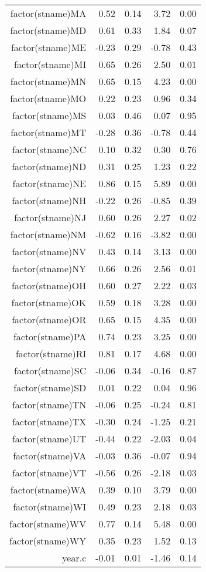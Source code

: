 \begin{table}[ht]
\begin{tabular}{rrrrr}
  factor(stname)MA & 0.52 & 0.14 & 3.72 & 0.00 \\ 
  factor(stname)MD & 0.61 & 0.33 & 1.84 & 0.07 \\ 
  factor(stname)ME & -0.23 & 0.29 & -0.78 & 0.43 \\ 
  factor(stname)MI & 0.65 & 0.26 & 2.50 & 0.01 \\ 
  factor(stname)MN & 0.65 & 0.15 & 4.23 & 0.00 \\ 
  factor(stname)MO & 0.22 & 0.23 & 0.96 & 0.34 \\ 
  factor(stname)MS & 0.03 & 0.46 & 0.07 & 0.95 \\ 
  factor(stname)MT & -0.28 & 0.36 & -0.78 & 0.44 \\ 
  factor(stname)NC & 0.10 & 0.32 & 0.30 & 0.76 \\ 
  factor(stname)ND & 0.31 & 0.25 & 1.23 & 0.22 \\ 
  factor(stname)NE & 0.86 & 0.15 & 5.89 & 0.00 \\ 
  factor(stname)NH & -0.22 & 0.26 & -0.85 & 0.39 \\ 
  factor(stname)NJ & 0.60 & 0.26 & 2.27 & 0.02 \\ 
  factor(stname)NM & -0.62 & 0.16 & -3.82 & 0.00 \\ 
  factor(stname)NV & 0.43 & 0.14 & 3.13 & 0.00 \\ 
  factor(stname)NY & 0.66 & 0.26 & 2.56 & 0.01 \\ 
  factor(stname)OH & 0.60 & 0.27 & 2.22 & 0.03 \\ 
  factor(stname)OK & 0.59 & 0.18 & 3.28 & 0.00 \\ 
  factor(stname)OR & 0.65 & 0.15 & 4.35 & 0.00 \\ 
  factor(stname)PA & 0.74 & 0.23 & 3.25 & 0.00 \\ 
  factor(stname)RI & 0.81 & 0.17 & 4.68 & 0.00 \\ 
  factor(stname)SC & -0.06 & 0.34 & -0.16 & 0.87 \\ 
  factor(stname)SD & 0.01 & 0.22 & 0.04 & 0.96 \\ 
  factor(stname)TN & -0.06 & 0.25 & -0.24 & 0.81 \\ 
  factor(stname)TX & -0.30 & 0.24 & -1.25 & 0.21 \\ 
  factor(stname)UT & -0.44 & 0.22 & -2.03 & 0.04 \\ 
  factor(stname)VA & -0.03 & 0.36 & -0.07 & 0.94 \\ 
  factor(stname)VT & -0.56 & 0.26 & -2.18 & 0.03 \\ 
  factor(stname)WA & 0.39 & 0.10 & 3.79 & 0.00 \\ 
  factor(stname)WI & 0.49 & 0.23 & 2.18 & 0.03 \\ 
  factor(stname)WV & 0.77 & 0.14 & 5.48 & 0.00 \\ 
  factor(stname)WY & 0.35 & 0.23 & 1.52 & 0.13 \\ 
  year.c & -0.01 & 0.01 & -1.46 & 0.14 \\ 
   \hline
\end{tabular}
\end{table}
